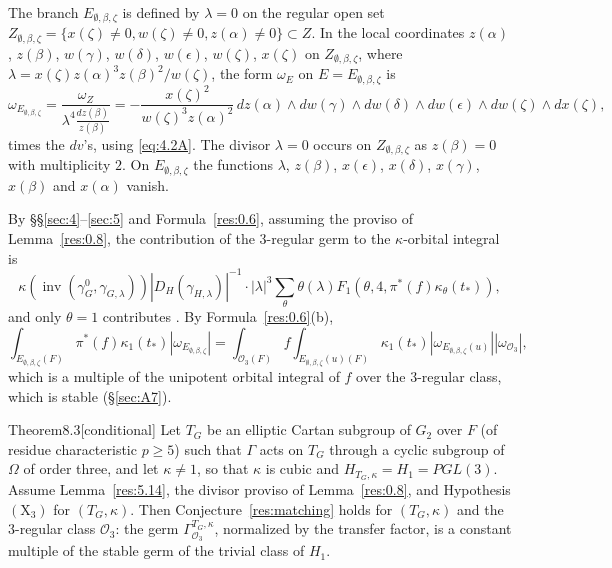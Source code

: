 \documentclass[12pt,letterpaper]{amsart}
\theoremstyle{plain}
\theoremstyle{definition}
\theoremstyle{remark}
\theoremstyle{definition}
\newcommand{\eps}{\epsilon}
\DeclareMathOperator{\inv}{inv}
\begin{document}
The branch $E_{\emptyset,\beta,\zeta}$ is defined by
$\lambda =0$ on the regular open set $Z_{\emptyset,\beta,\zeta}=
\{x(\zeta)\not= 0,w(\zeta)\not= 0,z(\alpha)\not= 0\}\subset Z$.
In the local coordinates
$z(\alpha)$, $z(\beta)$, $w(\gamma)$, $w(\delta)$,
$w(\eps)$, $w(\zeta)$, $x(\zeta)$ on
$Z_{\emptyset,\beta,\zeta}$, where $\lambda=x(\zeta)z(\alpha)^3z(\beta)^2/
w(\zeta)$, the form
$\omega_{E}$ on $E=E_{\emptyset,\beta,\zeta}$ is
\begin{equation}\tag{8.1}\label{eq:8.1}
\omega_{E_{\emptyset,\beta,\zeta}}
=\frac{\omega_{Z}}{\lambda^4 \frac{dz(\beta)}{z(\beta)}}
= -\frac{x(\zeta)^2}{w(\zeta)^3z(\alpha)^2}\,
dz(\alpha)\wedge dw(\gamma)\wedge dw(\delta)\wedge dw(\epsilon)\wedge
dw(\zeta)\wedge dx(\zeta),
\end{equation}
times the $dv$'s, using \eqref{eq:4.2A}.
The divisor $\lambda =0$ occurs on
$Z_{\emptyset,\beta,\zeta}$ as $z(\beta)=0$ with multiplicity $2$.
On $E_{\emptyset,\beta,\zeta}$ the functions $\lambda$, $z(\beta)$,
$x(\epsilon)$, $x(\delta)$, $x(\gamma)$, $x(\beta)$ and $x(\alpha)$ vanish.

By \S\S\ref{sec:4}--\ref{sec:5} and Formula~\ref{res:0.6}, assuming the
proviso of Lemma~\ref{res:0.8}, the contribution of the
$3$-regular germ to the $\kappa$-orbital
integral is
\[
\kappa(\inv(\gamma_G^0,\gamma_{G,\lambda}))|D_H(\gamma_{H,\lambda})|^{-1}
\cdot|\lambda|^3\sum_{\theta}\theta(\lambda)
F_1(\theta,4,\pi^*(f)\kappa_\theta(t_*)),
\]
and only $\theta =1$ contributes
\cite[Ch.~VI, \S2]{Ha92a}. By Formula~\ref{res:0.6}(b),
\begin{equation}\tag{8.2}\label{eq:8.2}
\int_{E_{\emptyset,\beta,\zeta}(F)}\pi^*(f)\kappa_1(t_*)
|\omega_{E_{\emptyset,\beta,\zeta}}|
=\int_{{\mathcal O}_3(F)}f
\int_{E_{\emptyset,\beta,\zeta}(u)(F)}\kappa_1(t_*)
|\omega_{E_{\emptyset,\beta,\zeta}(u)}||\omega_{{\mathcal O}_3}|,
\end{equation}
which is a multiple of the unipotent
orbital integral of $f$ over the $3$-regular class, which is stable
(\S\ref{sec:A7}).

\begin{res}{Theorem}{8.3}[conditional]\label{res:8.3}
Let $T_G$ be an elliptic Cartan subgroup
of $G_2$ over $F$ (of residue characteristic $p\ge 5$) such that $\Gamma$ acts
on $T_G$ through a cyclic subgroup of $\Omega$ of order three, and let
$\kappa\neq1$, so that $\kappa$ is cubic and $H_{T_G,\kappa}=H_1=PGL(3)$.
Assume Lemma~\ref{res:5.14}, the divisor proviso of Lemma~\ref{res:0.8}, and
Hypothesis $(\mathrm X_3)$ for $(T_G,\kappa)$. Then
Conjecture~\ref{res:matching} holds for $(T_G,\kappa)$ and the $3$-regular
class $\mathcal O_3$: the germ $\Gamma^{T_G,\kappa}_{\mathcal O_3}$,
normalized by the transfer factor, is a constant multiple of the stable germ of
the trivial class of $H_1$.
\end{res}
\end{document}
